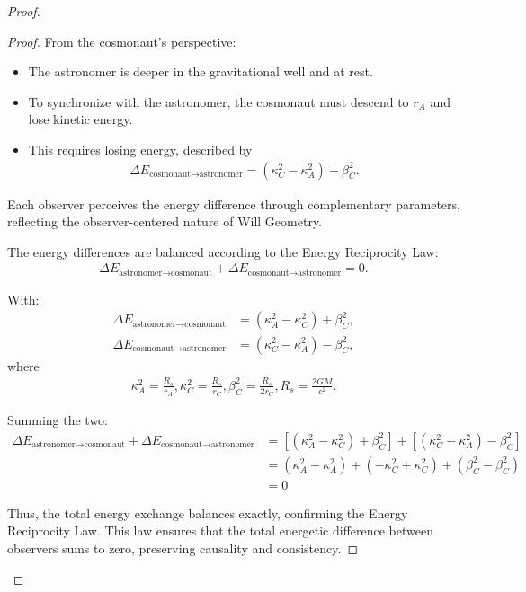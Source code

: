 \documentclass{article}
\begin{document}
\begin{theorem}
\begin{proof}
\begin{proof}
From the cosmonaut's perspective:
\begin{itemize}
\item The astronomer is deeper in the gravitational well and at rest.
\item To synchronize with the astronomer, the cosmonaut must descend to $r_A$ and lose kinetic energy.
\item This requires losing energy, described by
\begin{align}
\Delta E_{\text{cosmonaut}\rightarrow\text{astronomer}} = (\kappa^2_C - \kappa^2_A) - \beta^2_C.
\end{align}
\end{itemize}

Each observer perceives the energy difference through complementary parameters, reflecting the observer-centered nature of Will Geometry.

The energy differences are balanced according to the Energy Reciprocity Law:
\begin{align}
\Delta E_{\text{astronomer}\rightarrow\text{cosmonaut}} + \Delta E_{\text{cosmonaut}\rightarrow\text{astronomer}} = 0.
\end{align}

With:
\begin{align}
\Delta E_{\text{astronomer}\rightarrow\text{cosmonaut}} &= (\kappa^2_A - \kappa^2_C) + \beta^2_C, \\
\Delta E_{\text{cosmonaut}\rightarrow\text{astronomer}} &= (\kappa^2_C - \kappa^2_A) - \beta^2_C,
\end{align}
where
\begin{align}
\kappa^2_A = \frac{R_s}{r_A}, \kappa^2_C = \frac{R_s}{r_C}, \beta^2_C = \frac{R_s}{2r_C}, R_s = \frac{2GM}{c^2}.
\end{align}

Summing the two:
\begin{align}
\Delta E_{\text{astronomer}\rightarrow\text{cosmonaut}} + \Delta E_{\text{cosmonaut}\rightarrow\text{astronomer}} &= [(\kappa^2_A - \kappa^2_C) + \beta^2_C] + [(\kappa^2_C - \kappa^2_A) - \beta^2_C] \\
&= (\kappa^2_A - \kappa^2_A) + (-\kappa^2_C + \kappa^2_C) + (\beta^2_C - \beta^2_C) \\
&= 0
\end{align}

Thus, the total energy exchange balances exactly, confirming the Energy Reciprocity Law. This law ensures that the total energetic difference between observers sums to zero, preserving causality and consistency.


\end{proof}
\end{proof}
\end{theorem}
\end{document}

